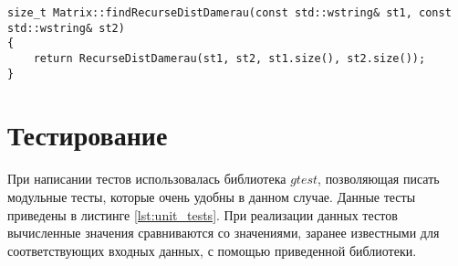 \begin{lstlisting}[label=lst:damer_rec_meth, caption=Метод нахождения расстояния Дамерау---Левенштейна с использованием функции \ref{lst:damer_rec}]
size_t Matrix::findRecurseDistDamerau(const std::wstring& st1, const std::wstring& st2)
{
	return RecurseDistDamerau(st1, st2, st1.size(), st2.size());
}
\end{lstlisting}

\section{Тестирование}
При написании тестов использовалась библиотека $gtest$, позволяющая писать модульные тесты, которые очень удобны 
в данном случае. Данные тесты приведены в листинге  \ref{lst:unit_tests}. При реализации данных тестов вычисленные значения
сравниваются со значениями, заранее известными для соответствующих входных данных, с помощью приведенной библиотеки.
